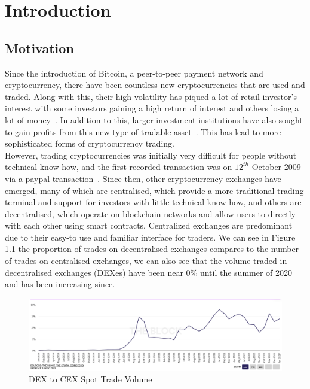 \chapter{Introduction}
\section{Motivation}
Since the introduction of Bitcoin, a peer-to-peer payment network and cryptocurrency, there have been countless new cryptocurrencies that are used and traded. Along with this, their high volatility has piqued a lot of retail investor's interest with some investors gaining a high return of interest and others losing a lot of money~\cite{losing_money_on_crypto_2021}. In addition to this, larger investment institutions have also sought to gain profits from this new type of tradable asset~\cite{gondek_what_nodate}. This has lead to more sophisticated forms of cryptocurrency trading.
\\[3mm]
However, trading cryptocurrencies was initially very difficult for people without technical know-how, and the first recorded transaction was on $12^{th}$ October 2009 via a paypal transaction~\cite{noauthor_history_nodate}. Since then, other cryptocurrency exchanges have emerged, many of which are centralised, which provide a more traditional trading terminal and support for investors with little technical know-how, and others are decentralised, which operate on blockchain networks and allow users to directly with each other using smart contracts. Centralized exchanges are predominant due to their easy-to use and familiar interface for traders. We can see in Figure \ref{fig:dex_to_cex} the proportion of trades on decentralised exchanges compares to the number of trades on centralised exchanges, we can also see that the volume traded in decentralised exchanges (DEXes) have been near 0\% until the summer of 2020 and has been increasing since. 

\begin{figure}[htb!]
    \centering
    \includegraphics[width=\textwidth]{introduction/Images/dex_to_cex.png}
    \caption{{DEX} to {CEX} {Spot} {Trade} {Volume}~\cite{dex_to_cex}}
    \label{fig:dex_to_cex}
\end{figure}
\vspace{-1cm}
